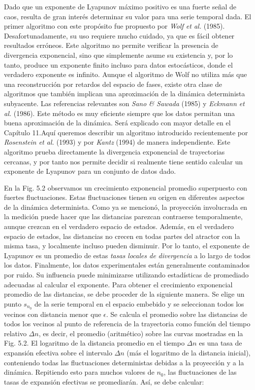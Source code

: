\documentclass[10pt,a4paper]{book}
\begin{document}
Dado que un exponente de Lyapunov máximo positivo es una fuerte señal de caos, resulta de gran interés determinar su valor para una serie temporal dada. El primer algoritmo con este propósito fue propuesto por \textit{Wolf et al.} (1985). Desafortunadamente, su uso requiere mucho cuidado, ya que es fácil obtener resultados erróneos. Este algoritmo no permite verificar la presencia de divergencia exponencial, sino que simplemente asume su existencia y, por lo tanto, produce un exponente finito incluso para datos estocásticos, donde el verdadero exponente es infinito. Aunque el algoritmo de Wolf no utiliza más que una reconstrucción por retardos del espacio de fases, existe otra clase de algoritmos que también implican una aproximación de la dinámica determinista subyacente. Las referencias relevantes son \textit{Sano \& Sawada} (1985) y \textit{Eckmann et al.} (1986). Este método es muy eficiente siempre que los datos permitan una buena aproximación de la dinámica. Será explicado con mayor detalle en el Capítulo 11.Aquí queremos describir un algoritmo introducido recientemente por \textit{Rosenstein et al.} (1993) y por \textit{Kantz} (1994) de manera independiente. Este algoritmo prueba directamente la divergencia exponencial de trayectorias cercanas, y por tanto nos permite decidir si realmente tiene sentido calcular un exponente de Lyapunov para un conjunto de datos dado.

\bigskip

En la Fig. 5.2 observamos un crecimiento exponencial promedio superpuesto con fuertes fluctuaciones. Estas fluctuaciones tienen su origen en diferentes aspectos de la dinámica determinista. Como ya se mencionó, la proyección involucrada en la medición puede hacer que las distancias parezcan contraerse temporalmente, aunque crezcan en el verdadero espacio de estados. Además, en el verdadero espacio de estados, las distancias no crecen en todas partes del atractor con la misma tasa, y localmente incluso pueden disminuir. Por lo tanto, el exponente de Lyapunov es un promedio de estas \textit{tasas locales de divergencia} a lo largo de todos los datos. Finalmente, los datos experimentales están generalmente contaminados por ruido. Su influencia puede minimizarse utilizando estadísticas de promediado adecuadas al calcular el exponente. Para obtener el crecimiento exponencial promedio de las distancias, se debe proceder de la siguiente manera. Se elige un punto $s_{n_0}$ de la serie temporal en el espacio embebido y se seleccionan todos los vecinos con distancia menor que $\epsilon$. Se calcula el promedio sobre las distancias de todos los vecinos al punto de referencia de la trayectoria como función del tiempo relativo $\Delta n$, es decir, el promedio (aritmético) sobre las curvas mostradas en la Fig. 5.2. El logaritmo de la distancia promedio en el tiempo $\Delta n$ es una tasa de expansión efectiva sobre el intervalo $\Delta n$ (más el logaritmo de la distancia inicial), conteniendo todas las fluctuaciones deterministas debidas a la proyección y a la dinámica. Repitiendo esto para muchos valores de $n_0$, las fluctuaciones de las tasas de expansión efectivas se promediarán. Así, se debe calcular:
\end{document}
